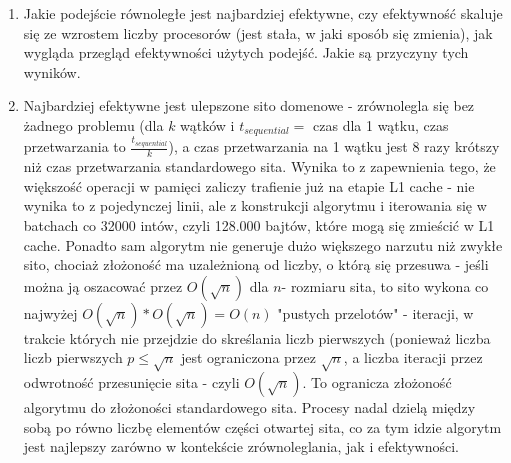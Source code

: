 \documentclass[12pt]{article}
\begin{document}
\begin{enumerate}
	\item Jakie podejście równoległe jest najbardziej efektywne, czy efektywność skaluje się ze wzrostem liczby procesorów (jest stała, w
	jaki sposób się zmienia), jak wygląda przegląd efektywności użytych podejść. Jakie są przyczyny tych wyników.
	\item Najbardziej efektywne jest ulepszone sito domenowe - zrównolegla się bez żadnego problemu (dla \(k\) wątków i \(t_{sequential} =\) czas dla 1 wątku, czas przetwarzania to \(\frac{t_{sequential}}{k}\)), a czas przetwarzania na 1 wątku jest 8 razy krótszy niż czas przetwarzania standardowego sita. Wynika to z zapewnienia tego, że większość operacji w pamięci zaliczy trafienie już na etapie L1 cache - nie wynika to z pojedynczej linii, ale z konstrukcji algorytmu i iterowania się w batchach co 32000 intów, czyli 128.000 bajtów, które mogą się zmieścić w L1 cache. Ponadto sam algorytm nie generuje dużo większego narzutu niż zwykłe sito, chociaż złożoność ma uzależnioną od liczby, o którą się przesuwa - jeśli można ją oszacować przez \(O(\sqrt{n})\) dla \(n\)- rozmiaru sita, to sito wykona co najwyżej \(O(\sqrt{n})*O(\sqrt{n})=O(n)\) "pustych przelotów" - iteracji, w trakcie których nie przejdzie do skreślania liczb pierwszych (ponieważ liczba liczb pierwszych \(p\le\sqrt{n}\) jest ograniczona przez \(\sqrt{n}\), a liczba iteracji przez odwrotność przesunięcie sita - czyli \(O(\sqrt{n})\). To ogranicza złożoność algorytmu do złożoności standardowego sita. Procesy nadal dzielą między sobą po równo liczbę elementów części otwartej sita, co za tym idzie algorytm jest najlepszy zarówno w kontekście zrównoleglania, jak i efektywności.
\end{enumerate}
\end{document}
